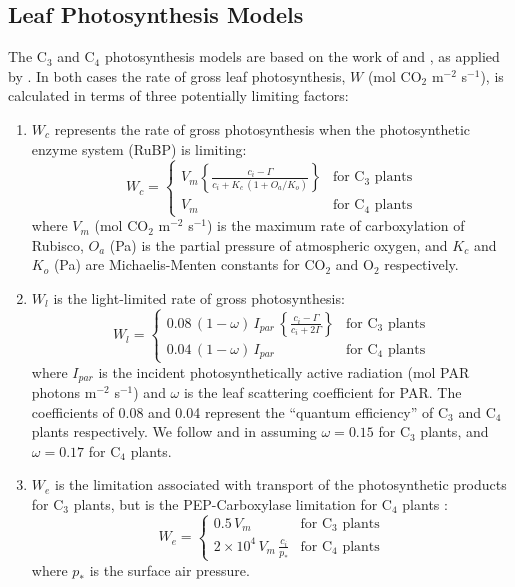 \documentclass[a4paper]{article}
\begin{document}
\subsection{Leaf Photosynthesis Models} \label{s:photo.leaf}
The C$_{3}$ and C$_{4}$ photosynthesis models are based on the work of
\citet{Col91} and \citet{Col92}, as applied by \citet{Sel96}. In both
cases the rate of gross leaf photosynthesis, $W$ (mol CO$_{2}$
m$^{-2}$ s$^{-1}$), is calculated in terms of three potentially
limiting factors:
\begin{enumerate}
\item $W_{c}$ represents the rate of gross photosynthesis when
the photosynthetic enzyme system (RuBP) is limiting:
\begin{equation}
W_{c} = \left \{ \begin{array}{lll}
              \displaystyle{V_{m} \left\{\frac{c_{i} - \Gamma}
 {c_{i} +K_{c} \, (1+O_{a}/K_{o})}\right\}} & \mbox{for C$_{3}$ plants}  \nonumber \\ [5mm]
                 V_{m}                    & \mbox{for C$_{4}$ plants}
             \end{array} \right.
\end{equation}
where $V_{m}$ (mol CO$_{2}$ m$^{-2}$ s$^{-1}$) is the maximum rate of
carboxylation of Rubisco, $O_{a}$ (Pa) is the partial pressure of
atmospheric oxygen, and $K_{c}$ and $K_{o}$ (Pa) are Michaelis-Menten
constants for CO$_{2}$ and O$_{2}$ respectively.
\item $W_{l}$ is the light-limited rate of gross photosynthesis:
\begin{equation}
W_{l} = \left \{ \begin{array}{lll}
              \displaystyle{0.08 \, (1-\omega) \, I_{par} \, \left\{\frac{c_{i} - \Gamma}
 {c_{i} +2 \Gamma}\right\}} & \mbox{for C$_{3}$ plants}  \nonumber \\ [5mm]
                 0.04 \, (1-\omega)  \, I_{par}        & \mbox{for C$_{4}$ plants}
             \end{array} \right.
\end{equation}
where $I_{par}$ is the incident photosynthetically active radiation
(mol PAR photons m$^{-2}$ s$^{-1}$) and $\omega$ is the leaf
scattering coefficient for PAR. The coefficients of 0.08 and 0.04
represent the ``quantum efficiency'' of C$_{3}$ and C$_{4}$ plants
respectively. We follow \citet{Col91} and \citet{Col92} in
assuming $\omega=0.15$ for C$_{3}$ plants, and $\omega=0.17$ for
C$_{4}$ plants.
\item $W_{e}$ is the limitation associated with transport of the
photosynthetic products for C$_{3}$ plants, but is the PEP-Carboxylase
limitation for C$_{4}$ plants \citep{Col92}:
\begin{equation}
W_{e} = \left \{ \begin{array}{lll}
                0.5 \, V_{m} & \mbox{for C$_{3}$ plants}  \nonumber \\ [5mm]
   \displaystyle{2 \times 10^{4} \, V_{m} \, \frac{c_{i}}{p_{*}}}
                             & \mbox{for C$_{4}$ plants}
             \end{array} \right.
\end{equation}
where $p_{*}$ is the surface air pressure.
\end{enumerate}
\end{document}
